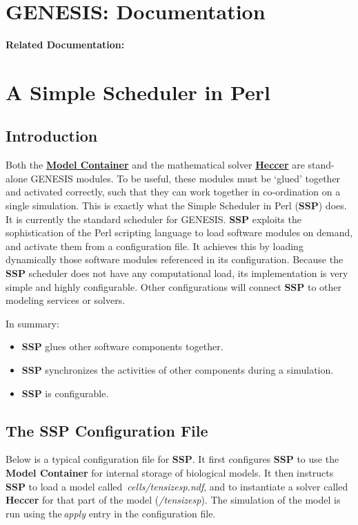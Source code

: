 \documentclass[12pt]{article}
\begin{document}
\section*{GENESIS: Documentation}

{\bf Related Documentation:}

\section*{A Simple Scheduler in Perl}

\subsection*{Introduction}

Both the \href{../model-container/model-container.tex}{\bf Model Container} and the mathematical solver \href{../heccer/heccer.tex}{\bf Heccer} are stand-alone GENESIS modules. To be useful, these modules must be `glued' together and activated correctly, such that they can work together in co-ordination on a single simulation. This is exactly what the Simple Scheduler in Perl ({\bf SSP}) does. It is currently the standard scheduler for GENESIS. {\bf SSP} exploits the sophistication of the Perl scripting language to load software modules on demand, and activate them from a configuration file. It achieves this by loading dynamically those software modules referenced in its configuration. Because the {\bf SSP} scheduler does not have any computational load, its implementation is very simple and highly configurable. Other configurations will connect {\bf SSP} to other modeling services or solvers.

In summary:

\begin{itemize}
\item {\bf SSP} glues other software components together.
\item {\bf SSP} synchronizes the activities of other components during a simulation.
\item {\bf SSP} is configurable. 
\end{itemize}

\subsection*{The SSP Configuration File}

Below is a typical configuration file for {\bf SSP}. It first configures {\bf SSP} to use the\,{\bf Model Container} for internal storage of biological models. It then instructs {\bf SSP} to load a model called \,{\it cells/tensizesp.ndf}, and to instantiate a solver called\,{\bf Heccer} for that part of the model ({\it /tensizesp}). The simulation of the model is run using the\,{\it apply} entry in the configuration file.
\end{document}
